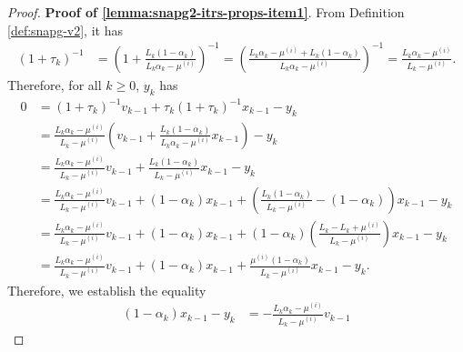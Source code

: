 \documentclass[12pt]{article}
\begin{document}
        \begin{proof}
            \textbf{Proof of \ref{lemma:snapg2-itrs-props-item1}}. 
            From Definition \ref{def:snapg-v2}, it has
            \begin{align*}
                (1 + \tau_k)^{-1}
                &=
                \left(
                    1 + \frac{L_k(1 - \alpha_k)}{L_k\alpha_k - \mu^{(i)}}
                \right)^{-1} = \left(
                    \frac{L_k\alpha_k - \mu^{(i)} + L_k(1 - \alpha_k)}{L_k\alpha_k - \mu^{(i)}}
                \right)^{-1}
                = \frac{L_k\alpha_k - \mu^{(i)}}{L_k - \mu^{(i)}}. 
            \end{align*}
            Therefore, for all $k \ge 0$, $y_k$ has 
            \begin{align*}
                0 &= (1 + \tau_k)^{-1} v_{k - 1} + \tau_k (1 + \tau_k)^{-1} x_{k - 1} - y_k
                \\
                &= \frac{L_k\alpha_k - \mu^{(i)}}{L_k - \mu^{(i)}} 
                \left(
                    v_{k - 1} + \frac{L_k(1 - \alpha_k)}{L_k\alpha_k - \mu^{(i)}} x_{k - 1}
                \right) - y_k
                \\
                &= \frac{L_k\alpha_k - \mu^{(i)}}{L_k - \mu^{(i)}} v_{k - 1}
                + \frac{L_k(1 - \alpha_k)}{L_k - \mu^{(i)}} x_{k - 1} - y_k
                \\
                &= \frac{L_k\alpha_k - \mu^{(i)}}{L_k - \mu^{(i)}} v_{k - 1} + (1 - \alpha_k)x_{k - 1}
                + 
                \left(
                    \frac{L_k(1 - \alpha_k)}{L_k - \mu^{(i)}} - (1 - \alpha_k)
                \right) x_{k - 1} - y_k
                \\
                &= \frac{L_k\alpha_k - \mu^{(i)}}{L_k - \mu^{(i)}} v_{k - 1} + (1 - \alpha_k)x_{k - 1}
                + 
                (1 - \alpha_k)\left(
                    \frac{L_k - L_k + \mu^{(i)}}{L_k - \mu^{(i)}}
                \right) x_{k - 1} - y_k
                \\
                &= \frac{L_k\alpha_k - \mu^{(i)}}{L_k - \mu^{(i)}} v_{k - 1} + (1 - \alpha_k)x_{k - 1}
                + 
                \frac{\mu^{(i)}(1 - \alpha_k)}{L_k - \mu^{(i)}}x_{k - 1} - y_k. 
            \end{align*}
            Therefore, we establish the equality 
            \begin{align*}
                (1 - \alpha_k)x_{k - 1} - y_k &= 
                - \frac{L_k\alpha_k - \mu^{(i)}}{L_k - \mu^{(i)}} v_{k - 1} 

\end{align*}
\end{proof}
\end{document}
